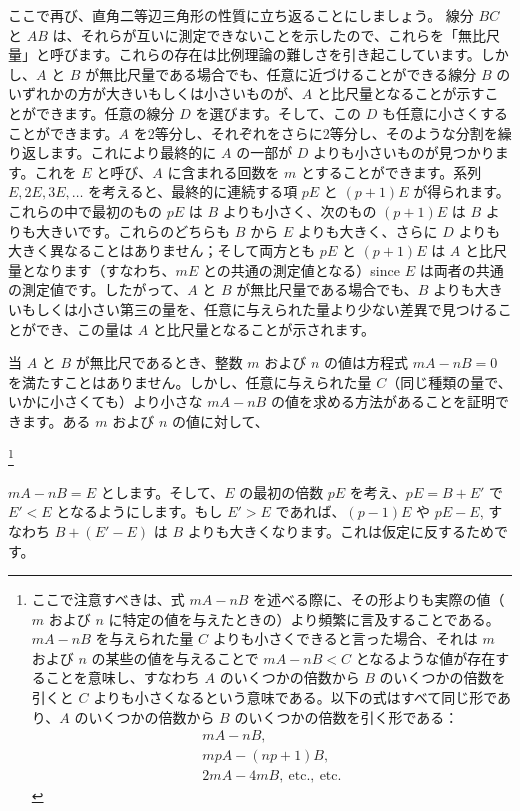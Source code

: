 \documentclass[a4paper,11pt,openany]{ltjsbook}
\newcommand{\etc}{\text{etc}}
\begin{document}
ここで再び、直角二等辺三角形の性質に立ち返ることにしましょう。
線分 $BC$ と $AB$ は、それらが互いに測定できないことを示したので、これらを「無比尺量」と呼びます。これらの存在は比例理論の難しさを引き起こしています。しかし、$A$ と $B$ が無比尺量である場合でも、任意に近づけることができる線分 $B$ のいずれかの方が大きいもしくは小さいものが、$A$ と比尺量となることが示すことができます。任意の線分 $D$ を選びます。そして、この $D$ も任意に小さくすることができます。$A$ を2等分し、それぞれをさらに2等分し、そのような分割を繰り返します。これにより最終的に $A$ の一部が $D$ よりも小さいものが見つかります。これを $E$ と呼び、$A$ に含まれる回数を $m$ とすることができます。系列 $E, 2E, 3E, \ldots$ を考えると、最終的に連続する項 $pE$ と $(p + 1)E$ が得られます。これらの中で最初のもの $pE$ は $B$ よりも小さく、次のもの $(p + 1)E$ は $B$ よりも大きいです。これらのどちらも $B$ から $E$ よりも大きく、さらに $D$ よりも大きく異なることはありません；そして両方とも $pE$ と $(p + 1)E$ は $A$ と比尺量となります（すなわち、$mE$ との共通の測定値となる）since $E$ は両者の共通の測定値です。したがって、$A$ と $B$ が無比尺量である場合でも、$B$ よりも大きいもしくは小さい第三の量を、任意に与えられた量より少ない差異で見つけることができ、この量は $A$ と比尺量となることが示されます。

当 $A$ と $B$ が無比尺であるとき、整数 $m$ および $n$ の値は方程式 $mA - nB = 0$ を満たすことはありません。しかし、任意に与えられた量 $C$（同じ種類の量で、いかに小さくても）より小さな $mA - nB$ の値を求める方法があることを証明できます。ある $m$ および $n$ の値に対して、

\footnote{ここで注意すべきは、式 $mA - nB$ を述べる際に、その形よりも実際の値（$m$ および $n$ に特定の値を与えたときの）より頻繁に言及することである。$mA - nB$ を与えられた量 $C$ よりも小さくできると言った場合、それは $m$ および $n$ の某些の値を与えることで $mA - nB < C$ となるような値が存在することを意味し、すなわち $A$ のいくつかの倍数から $B$ のいくつかの倍数を引くと $C$ よりも小さくなるという意味である。以下の式はすべて同じ形であり、$A$ のいくつかの倍数から $B$ のいくつかの倍数を引く形である：
\begin{align*}
  mA - nB, \\
  mpA - (np + 1)B, \\
  2mA - 4mB, \ \etc.,\ \etc.
\end{align*}}

$mA - nB = E$ とします。そして、$E$ の最初の倍数 $pE$ を考え、$pE = B + E'$ で $E' < E$ となるようにします。もし $E' > E$ であれば、$(p - 1)E$ や $pE - E$, すなわち $B + (E' - E)$ は $B$ よりも大きくなります。これは仮定に反するためです。
\end{document}
